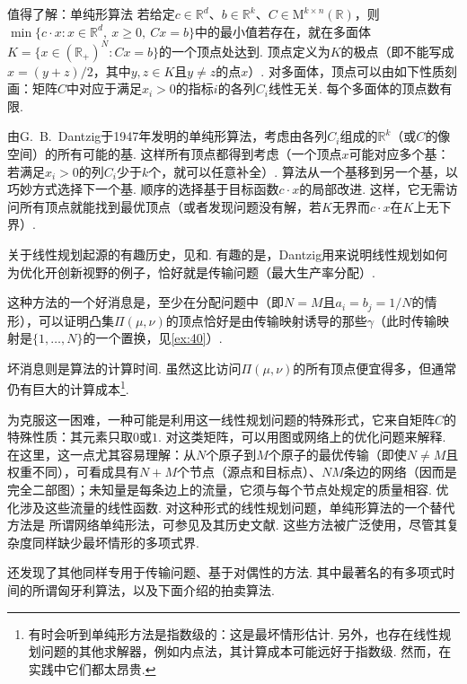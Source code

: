 \begin{sourcebox}{值得了解：单纯形算法}\label{box:6.7}
若给定$c\in\mathbb R^d$、$b\in\mathbb R^k$、$C\in\mathrm M^{k\times n}(\mathbb R)$，则$\min\{c\cdot x:x\in\mathbb R^d,\ x\ge0,\ Cx=b\}$中的最小值若存在，就在多面体$K=\{x\in(\mathbb R_+)^N:Cx=b\}$的一个顶点处达到. 顶点定义为$K$的极点（即不能写成$x=(y+z)/2$，其中$y,z\in K$且$y\ne z$的点$x$）. 对多面体，顶点可以由如下性质刻画：矩阵$C$中对应于满足$x_i>0$的指标$i$的各列$C_i$线性无关. 每个多面体的顶点数有限.

由G.~B.~Dantzig于1947年发明的单纯形算法，考虑由各列$C_i$组成的$\mathbb R^k$（或$C$的像空间）的所有可能的基. 这样所有顶点都得到考虑（一个顶点$x$可能对应多个基：若满足$x_i>0$的列$C_i$少于$k$个，就可以任意补全）. 算法从一个基移到另一个基，以巧妙方式选择下一个基. 顺序的选择基于目标函数$c\cdot x$的局部改进. 这样，它无需访问所有顶点就能找到最优顶点（或者发现问题没有解，若$K$无界而$c\cdot x$在$K$上无下界）.

关于线性规划起源的有趣历史，见\cite{b135}和\cite{b136}. 有趣的是，Dantzig用来说明线性规划如何为优化开创新视野的例子，恰好就是传输问题（最大生产率分配）.
\end{sourcebox}

这种方法的一个好消息是，至少在分配问题中（即$N=M$且$a_i=b_j=1/N$的情形），可以证明凸集$\Pi(\mu,\nu)$的顶点恰好是由传输映射诱导的那些$\gamma$（此时传输映射是$\{1,\ldots,N\}$的一个置换，见\autoref{ex:40}）.

坏消息则是算法的计算时间. 虽然这比访问$\Pi(\mu,\nu)$的所有顶点便宜得多，但通常仍有巨大的计算成本\footnote{有时会听到单纯形方法是指数级的：这是最坏情形估计. 另外，也存在线性规划问题的其他求解器，例如内点法，其计算成本可能远好于指数级. 然而，在实践中它们都太昂贵.}.

为克服这一困难，一种可能是利用这一线性规划问题的特殊形式，它来自矩阵$C$的特殊性质：其元素只取$0$或$1$. 对这类矩阵，可以用图或网络上的优化问题来解释. 在这里，这一点尤其容易理解：从$N$个原子到$M$个原子的最优传输（即使$N\ne M$且权重不同），可看成具有$N+M$个节点（源点和目标点）、$NM$条边的网络（因而是完全二部图）；未知量是每条边上的流量，它须与每个节点处规定的质量相容. 优化涉及这些流量的线性函数. 对这种形式的线性规划问题，单纯形算法的一个替代方法是\label{idx:i106-p237}
所谓网络单纯形法，可参见\cite{b2}及其历史文献\cite{b169}. 这些方法被广泛使用，尽管其复杂度同样缺少最坏情形的多项式界.

还发现了其他同样专用于传输问题、基于对偶性的方法. 其中最著名的有多项式时间的所谓匈牙利算法\cite{b204}，以及下面介绍的拍卖算法.

